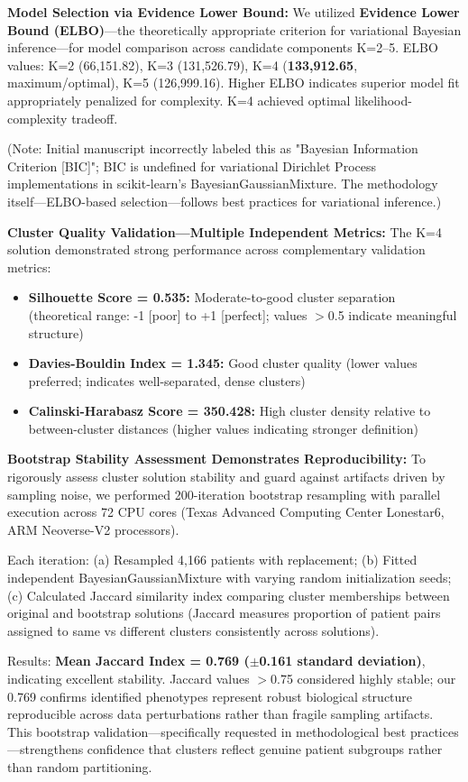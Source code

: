 \documentclass[11pt]{article}
\begin{document}
\textbf{Model Selection via Evidence Lower Bound:} We utilized \textbf{Evidence Lower Bound (ELBO)}—the theoretically appropriate criterion for variational Bayesian inference—for model comparison across candidate components K=2--5. ELBO values: K=2 (66,151.82), K=3 (131,526.79), K=4 (\textbf{133,912.65}, maximum/optimal), K=5 (126,999.16). Higher ELBO indicates superior model fit appropriately penalized for complexity. K=4 achieved optimal likelihood-complexity tradeoff. 

(Note: Initial manuscript incorrectly labeled this as "Bayesian Information Criterion [BIC]"; BIC is undefined for variational Dirichlet Process implementations in scikit-learn's BayesianGaussianMixture. The methodology itself—ELBO-based selection—follows best practices for variational inference.)

\textbf{Cluster Quality Validation—Multiple Independent Metrics:} The K=4 solution demonstrated strong performance across complementary validation metrics:

\begin{itemize}
\item \textbf{Silhouette Score = 0.535:} Moderate-to-good cluster separation (theoretical range: -1 [poor] to +1 [perfect]; values $>$0.5 indicate meaningful structure)
\item \textbf{Davies-Bouldin Index = 1.345:} Good cluster quality (lower values preferred; indicates well-separated, dense clusters)
\item \textbf{Calinski-Harabasz Score = 350.428:} High cluster density relative to between-cluster distances (higher values indicating stronger definition)
\end{itemize}

\textbf{Bootstrap Stability Assessment Demonstrates Reproducibility:} To rigorously assess cluster solution stability and guard against artifacts driven by sampling noise, we performed 200-iteration bootstrap resampling with parallel execution across 72 CPU cores (Texas Advanced Computing Center Lonestar6, ARM Neoverse-V2 processors). 

Each iteration: (a) Resampled 4,166 patients with replacement; (b) Fitted independent BayesianGaussianMixture with varying random initialization seeds; (c) Calculated Jaccard similarity index comparing cluster memberships between original and bootstrap solutions (Jaccard measures proportion of patient pairs assigned to same vs different clusters consistently across solutions).

Results: \textbf{Mean Jaccard Index = 0.769 ($\pm$0.161 standard deviation)}, indicating excellent stability. Jaccard values $>$0.75 considered highly stable; our 0.769 confirms identified phenotypes represent robust biological structure reproducible across data perturbations rather than fragile sampling artifacts. This bootstrap validation—specifically requested in methodological best practices\cite{collins2024tripod}—strengthens confidence that clusters reflect genuine patient subgroups rather than random partitioning.
\end{document}
